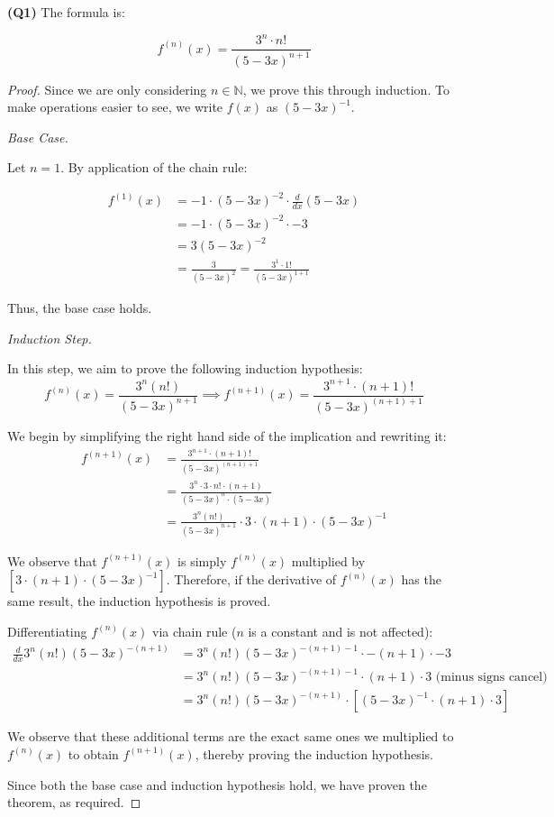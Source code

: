 \documentclass[12pt, a4paper]{article}
\newcommand{\N}{\mathbb{N}}
\newcommand{\ddx}{\frac{d}{dx}}
\begin{document}
\textbf{(Q1)}
The formula is:

\[
    \displaystyle f^{(n)}(x) = \frac{3^n \cdot n!}{(5 - 3x)^{n + 1}}
\]

\begin{proof}
    Since we are only considering $n \in \N$, we prove this through induction. To make
    operations easier to see, we write $f(x)$ as $(5 - 3x)^{-1}$.

    \textit{Base Case.}

    Let $n = 1$. By application of the chain rule:

    \begin{align*}
        f^{(1)}(x) & = -1 \cdot (5 - 3x)^{-2} \cdot \ddx(5 - 3x)\\
        & = -1 \cdot (5 - 3x)^{-2} \cdot -3\\
        & = 3(5 - 3x)^{-2}\\
        & = \frac{3}{(5 - 3x)^2} = \frac{3^1 \cdot 1!}{(5 - 3x)^{1 + 1}}
    \end{align*}

    Thus, the base case holds.

    \textit{Induction Step.}

    In this step, we aim to prove the following induction hypothesis:
    \[
        f^{(n)}(x) = \frac{3^n(n!)}{(5 - 3x)^{n + 1}}
        \implies f^{(n + 1)}(x) = \frac{3^{n + 1} \cdot (n + 1)!}{(5 - 3x)^{(n + 1) + 1}}
    \]

    We begin by simplifying the right hand side of the implication and rewriting it:
    \begin{align*}
        f^{(n + 1)}(x) & = \frac{3^{n + 1} \cdot (n + 1)!}{(5 - 3x)^{(n + 1) + 1}}\\
        & = \frac{3^n \cdot 3 \cdot n! \cdot (n + 1)}{(5 - 3x)^n \cdot (5 - 3x)}\\
        & = \frac{3^n(n!)}{(5 - 3x)^{n + 1}} \cdot 3 \cdot (n + 1) \cdot (5 - 3x)^{-1}
    \end{align*}

    We observe that $f^{(n + 1)}(x)$ is simply $f^{(n)}(x)$ multiplied by
    $\left[3 \cdot (n + 1) \cdot (5 - 3x)^{-1}\right]$. Therefore, if the derivative
    of $f^{(n)}(x)$ has the same result, the induction hypothesis is proved.

    Differentiating $f^{(n)}(x)$ via chain rule ($n$ is a constant and is not affected):
    \begin{align*}
        \ddx 3^n(n!)(5 - 3x)^{-(n + 1)} & = 
        3^n(n!)(5 - 3x)^{-(n + 1) - 1} \cdot -(n + 1) \cdot -3\\
        & = 3^n(n!)(5 - 3x)^{-(n + 1) - 1} \cdot (n + 1) \cdot 3 
        \text{ (minus signs cancel)}\\
        & = 3^n(n!)(5 - 3x)^{-(n + 1) } \cdot 
        \left[(5 - 3x)^{-1} \cdot (n + 1) \cdot 3\right]
    \end{align*}

    We observe that these additional terms are the exact same ones we multiplied to $f^{(n)}(x)$ 
    to obtain $f^{(n + 1)}(x)$, thereby proving the induction hypothesis.

    Since both the base case and induction hypothesis hold, we have proven the theorem, as required.
\end{proof}
\end{document}
